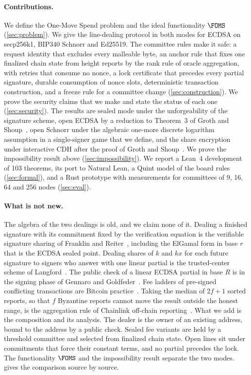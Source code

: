 \paragraph{Contributions.} We define the One-Move Spend problem and the ideal functionality $\FOMS$ (\cref{sec:problem}). We give the line-dealing protocol in both modes for ECDSA on secp256k1, BIP340 Schnorr and Ed25519. The committee rules make it safe: a request identity that excludes every malleable byte, an anchor rule that fixes one finalized chain state from height reports by the rank rule of oracle aggregation, with retries that consume no nonce, a lock certificate that precedes every partial signature, durable consumption of nonce slots, deterministic transaction construction, and a freeze rule for a committee change (\cref{sec:construction}). We prove the security claims that we make and state the status of each one (\cref{sec:security}). The results are sealed mode under the unforgeability of the signature scheme, open ECDSA by a reduction to Theorem~3 of Groth and Shoup~\cite{GS21}, open Schnorr under the algebraic one-more discrete logarithm assumption in a single-signer game that we define, and the share encryption under interactive CDH after the proof of Groth and Shoup~\cite{GS22}. We prove the impossibility result above (\cref{sec:impossibility}). We report a Lean~4 development of 103 theorems, its port to Natural Lean, a Quint model of the board rules (\cref{sec:formal}), and a Rust prototype with measurements for committees of 9, 16, 64 and 256 nodes (\cref{sec:eval}).

\paragraph{What is not new.} The algebra of the two dealings is old, and we claim none of it. Dealing a finished signature with its commitment fixed by the verification equation is the verifiable signature sharing of Franklin and Reiter~\cite{FR95}, including the ElGamal form in base $r$ that is the ECDSA sealed point. Dealing shares of $k$ and $kx$ for each future signature to signers who answer with one linear partial is the trusted-center scheme of Langford~\cite{Lan95}. The public check of a linear ECDSA partial in base $R$ is in the signing phase of Gennaro and Goldfeder~\cite{GG20}. Fee ladders of pre-signed conflicting transactions are Bitcoin practice~\cite{SHMB20a,SHMB20b,Todd23}. Taking the median of $2f+1$ sorted reports, so that $f$ Byzantine reports cannot move the result outside the honest range, is the aggregation rule of Chainlink off-chain reporting~\cite{OCR21}. What we add is the composition and its analysis. The dealer is the owner of an existing address, bound to the address by a public check. Sealed fee variants are held by a threshold committee and selected from finalized chain state. Open lines sit under commitments that force their constant terms, and no partial precedes the lock. The functionality $\FOMS$ and the impossibility result separate the two modes.  gives the comparison source by source.

